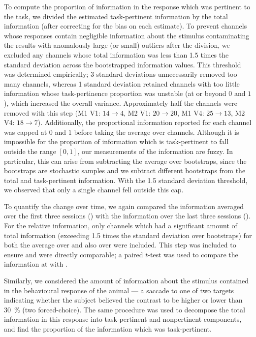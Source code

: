 To compute the proportion of information in the response which was pertinent to the task, we divided the estimated task-pertinent information by the total information (after correcting for the bias on each estimate).
To prevent channels whose responses contain negligible information about the stimulus contaminating the results with anomalously large (or small) outliers after the division, we excluded any channels whose total information was less than \num{1.5} times the standard deviation across the bootstrapped information values.
This threshold was determined empirically; \num{3} standard deviations unnecessarily removed too many channels, whereas \num{1} standard deviation retained channels with too little information whose task-pertinence proportion was unstable (at or beyond $0$ and $1$), which increased the overall variance.
Approximately half the channels were removed with this step (\ac{M1} \ac{V1}: $14\to4$, \ac{M2} \ac{V1}: $20\to20$, \ac{M1} \ac{V4}: $25\to13$, \ac{M2} \ac{V4}: $18\to7$).
Additionally, the proportional information reported for each channel was capped at $0$ and $1$ before taking the average over channels.
Although it is impossible for the proportion of information which is task-pertinent to fall outside the range $[0, 1]$, our measurements of the information are fuzzy.
In particular, this can arise from subtracting the average over bootstraps, since the bootstraps are stochastic samples and we subtract different bootstraps from the total and task-pertinent information.
With the \num{1.5} standard deviation threshold, we observed that only a single channel fell outside this cap.

To quantify the change over time, we again compared the information averaged over the first three sessions () with the information over the last three sessions ().
For the relative information, only channels which had a significant amount of total information (exceeding \num{1.5} times the standard deviation over bootstraps) for both the average over  and also over  were included.
This step was included to ensure  and  were directly comparable; a paired $t$-test was used to compare the information at  with .

Similarly, we considered the amount of information about the stimulus contained in the behavioural response of the animal --- a saccade to one of two targets indicating whether the subject believed the contrast to be higher or lower than \SI{30}{\percent} (two forced-choice).
The same procedure was used to decompose the total information in this response into task-pertinent and nonpertinent components, and find the proportion of the information which was task-pertinent.


